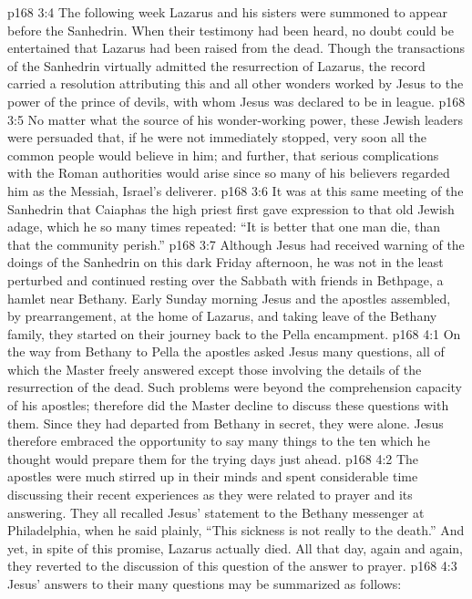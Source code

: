 \vs p168 3:4 The following week Lazarus and his sisters were summoned to appear before the Sanhedrin. When their testimony had been heard, no doubt could be entertained that Lazarus had been raised from the dead. Though the transactions of the Sanhedrin virtually admitted the resurrection of Lazarus, the record carried a resolution attributing this and all other wonders worked by Jesus to the power of the prince of devils, with whom Jesus was declared to be in league.
\vs p168 3:5 No matter what the source of his wonder\hyp{}working power, these Jewish leaders were persuaded that, if he were not immediately stopped, very soon all the common people would believe in him; and further, that serious complications with the Roman authorities would arise since so many of his believers regarded him as the Messiah, Israel’s deliverer.
\vs p168 3:6 It was at this same meeting of the Sanhedrin that Caiaphas the high priest first gave expression to that old Jewish adage, which he so many times repeated: “It is better that one man die, than that the community perish.”
\vs p168 3:7 Although Jesus had received warning of the doings of the Sanhedrin on this dark Friday afternoon, he was not in the least perturbed and continued resting over the Sabbath with friends in Bethpage, a hamlet near Bethany. Early Sunday morning Jesus and the apostles assembled, by prearrangement, at the home of Lazarus, and taking leave of the Bethany family, they started on their journey back to the Pella encampment.\plusone
{}
\vs p168 4:1 On the way from Bethany to Pella the apostles asked Jesus many questions, all of which the Master freely answered except those involving the details of the resurrection of the dead. Such problems were beyond the comprehension capacity of his apostles; therefore did the Master decline to discuss these questions with them. Since they had departed from Bethany in secret, they were alone. Jesus therefore embraced the opportunity to say many things to the ten which he thought would prepare them for the trying days just ahead.
\vs p168 4:2 The apostles were much stirred up in their minds and spent considerable time discussing their recent experiences as they were related to prayer and its answering. They all recalled Jesus’ statement to the Bethany messenger at Philadelphia, when he said plainly, \textcolor{ubdarkred}{“This sickness is not really to the death.”} And yet, in spite of this promise, Lazarus actually died. All that day, again and again, they reverted to the discussion of this question of the answer to prayer.
\vs p168 4:3 Jesus’ answers to their many questions may be summarized as follows:
